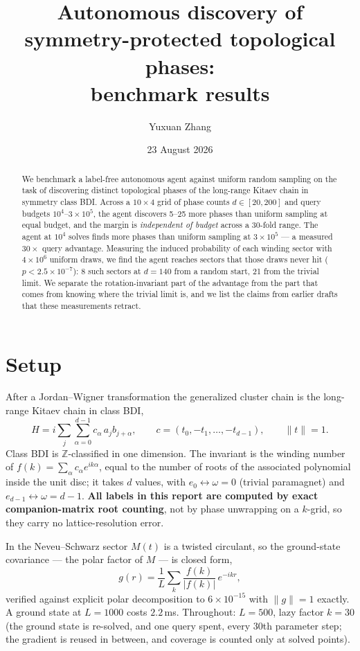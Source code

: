 \documentclass[11pt,a4paper]{article}
\title{\vspace{-1.4cm}\Large Autonomous discovery of symmetry-protected topological phases:\\
benchmark results}
\author{\normalsize Yuxuan Zhang}
\date{\normalsize 23 August 2026}
\begin{document}
\maketitle
\vspace{-0.7cm}

\begin{abstract}\noindent
We benchmark a label-free autonomous agent against uniform random sampling on the task of
discovering distinct topological phases of the long-range Kitaev chain in symmetry class BDI.
Across a $10\times4$ grid of phase counts $d\in[20,200]$ and query budgets
$10^4$--$3\times10^5$, the agent discovers 5--25 more phases than uniform sampling at equal
budget, and the margin is \emph{independent of budget} across a 30-fold range. The agent at
$10^4$ solves finds more phases than uniform sampling at $3\times10^5$ --- a measured
$30\times$ query advantage. Measuring the induced probability of each winding sector with
$4\times10^6$ uniform draws, we find the agent reaches sectors that those draws never hit
($p<2.5\times10^{-7}$): 8 such sectors at $d=140$ from a random start, 21 from the trivial
limit. We separate the rotation-invariant part of the advantage from the part that comes from
knowing where the trivial limit is, and we list the claims from earlier drafts that these
measurements retract.
\end{abstract}

\section{Setup}

After a Jordan--Wigner transformation the generalized cluster chain is the long-range Kitaev
chain in class BDI,
\[
H=i\sum_{j}\sum_{\alpha=0}^{d-1} c_\alpha\, a_j b_{j+\alpha},
\qquad c=(t_0,-t_1,\dots,-t_{d-1}),\qquad \|t\|=1 .
\]
Class BDI is $\mathbb{Z}$-classified in one dimension. The invariant is the winding number of
$f(k)=\sum_\alpha c_\alpha e^{ik\alpha}$, equal to the number of roots of the associated
polynomial inside the unit disc; it takes $d$ values, with $e_0\leftrightarrow\omega=0$
(trivial paramagnet) and $e_{d-1}\leftrightarrow\omega=d-1$. \textbf{All labels in this report
are computed by exact companion-matrix root counting}, not by phase unwrapping on a $k$-grid,
so they carry no lattice-resolution error.

In the Neveu--Schwarz sector $M(t)$ is a twisted circulant, so the ground-state covariance ---
the polar factor of $M$ --- is closed form,
\[
g(r)=\frac{1}{L}\sum_k \frac{f(k)}{|f(k)|}\,e^{-ikr},
\]
verified against explicit polar decomposition to $6\times10^{-15}$ with $\|g\|=1$ exactly.
A ground state at $L=1000$ costs $2.2$\,ms. Throughout: $L=500$, lazy factor $k=30$
(the ground state is re-solved, and one query spent, every 30th parameter step; the gradient is
reused in between, and coverage is counted only at solved points).
\end{document}
